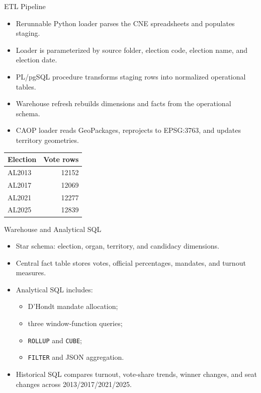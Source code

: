 \documentclass[aspectratio=169]{beamer}
\begin{document}
\begin{frame}{ETL Pipeline}
  \begin{itemize}
    \item Rerunnable Python loader parses the CNE spreadsheets and populates staging.
    \item Loader is parameterized by source folder, election code, election name, and election date.
    \item PL/pgSQL procedure transforms staging rows into normalized operational tables.
    \item Warehouse refresh rebuilds dimensions and facts from the operational schema.
    \item CAOP loader reads GeoPackages, reprojects to EPSG:3763, and updates territory geometries.
  \end{itemize}

  \vspace{0.2cm}
  \begin{table}
    \begin{tabular}{lr}
      \toprule
      Election & Vote rows\\
      \midrule
      AL2013 & 12152\\
      AL2017 & 12069\\
      AL2021 & 12277\\
      AL2025 & 12839\\
      \bottomrule
    \end{tabular}
  \end{table}
\end{frame}

\begin{frame}{Warehouse and Analytical SQL}
  \begin{itemize}
    \item Star schema: election, organ, territory, and candidacy dimensions.
    \item Central fact table stores votes, official percentages, mandates, and turnout measures.
    \item Analytical SQL includes:
      \begin{itemize}
        \item D'Hondt mandate allocation;
        \item three window-function queries;
        \item \texttt{ROLLUP} and \texttt{CUBE};
        \item \texttt{FILTER} and JSON aggregation.
      \end{itemize}
    \item Historical SQL compares turnout, vote-share trends, winner changes, and seat changes across 2013/2017/2021/2025.
  \end{itemize}
\end{frame}
\end{document}
